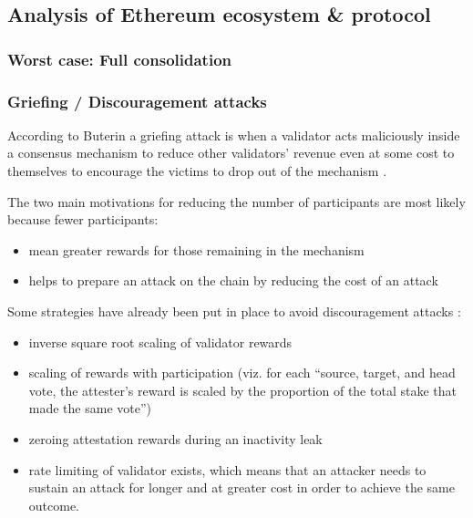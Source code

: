 \subsection{Analysis of Ethereum ecosystem \& protocol}
\subsubsection{Worst case: Full consolidation}

\subsubsection{Griefing / Discouragement attacks}
According to Buterin a griefing attack is when a validator acts maliciously inside a consensus mechanism to reduce other validators' revenue even at some cost to themselves to encourage the victims to drop out of the mechanism \cite{buterin2018c}.

The two main motivations for reducing the number of participants are most likely because fewer participants:
\begin{itemize}
\item mean greater rewards for those remaining in the mechanism
\item helps to prepare an attack on the chain by reducing the cost of an attack
\end{itemize}

Some strategies have already been put in place to avoid discouragement attacks \cite{Edgington2023}:
\begin{itemize}
\item inverse square root scaling of validator rewards
\item scaling of rewards with participation (viz. for each ``source, target, and head vote, the attester's reward is scaled by the proportion of the total stake that made the same vote'')
\item zeroing attestation rewards during an inactivity leak
\item rate limiting of validator exists, which means that an attacker needs to sustain an attack for longer and at greater cost in order to achieve the same outcome.
\end{itemize}

